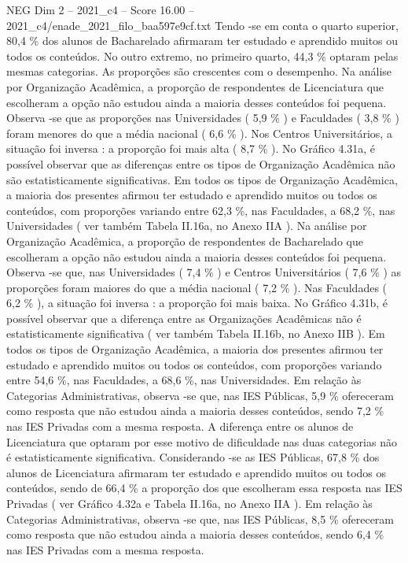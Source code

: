 \begin{textsample}{NEG Dim 2 – 2021\_c4 – Score 16.00 – 2021\_c4/enade\_2021\_filo\_baa597e9cf.txt}
Tendo -se em conta o quarto superior, 80,4 \% dos alunos de Bacharelado afirmaram ter estudado e aprendido muitos ou todos os conteúdos.
No outro extremo, no primeiro quarto, 44,3 \% optaram pelas mesmas categorias.
As proporções são crescentes com o desempenho.
Na análise por Organização Acadêmica, a proporção de respondentes de Licenciatura que escolheram a opção não estudou ainda a maioria desses conteúdos foi pequena.
Observa -se que as proporções nas Universidades ( 5,9 \% ) e Faculdades ( 3,8 \% ) foram menores do que a média nacional ( 6,6 \% ).
Nos Centros Universitários, a situação foi inversa : a proporção foi mais alta ( 8,7 \% ).
No Gráfico 4.31a, é possível observar que as diferenças entre os tipos de Organização Acadêmica não são estatisticamente significativas.
Em todos os tipos de Organização Acadêmica, a maioria dos presentes afirmou ter estudado e aprendido muitos ou todos os conteúdos, com proporções variando entre 62,3 \%, nas Faculdades, a 68,2 \%, nas Universidades ( ver também Tabela II.16a, no Anexo IIA ).
Na análise por Organização Acadêmica, a proporção de respondentes de Bacharelado que escolheram a opção não estudou ainda a maioria desses conteúdos foi pequena.
Observa -se que, nas Universidades ( 7,4 \% ) e Centros Universitários ( 7,6 \% ) as proporções foram maiores do que a média nacional ( 7,2 \% ).
Nas Faculdades ( 6,2 \% ), a situação foi inversa : a proporção foi mais baixa.
No Gráfico 4.31b, é possível observar que a diferença entre as Organizações Acadêmicas não é estatisticamente significativa ( ver também Tabela II.16b, no Anexo IIB ).
Em todos os tipos de Organização Acadêmica, a maioria dos presentes afirmou ter estudado e aprendido muitos ou todos os conteúdos, com proporções variando entre 54,6 \%, nas Faculdades, a 68,6 \%, nas Universidades.
Em relação às Categorias Administrativas, observa -se que, nas IES Públicas, 5,9 \% ofereceram como resposta que não estudou ainda a maioria desses conteúdos, sendo 7,2 \% nas IES Privadas com a mesma resposta.
A diferença entre os alunos de Licenciatura que optaram por esse motivo de dificuldade nas duas categorias não é estatisticamente significativa.
Considerando -se as IES Públicas, 67,8 \% dos alunos de Licenciatura afirmaram ter estudado e aprendido muitos ou todos os conteúdos, sendo de 66,4 \% a proporção dos que escolheram essa resposta nas IES Privadas ( ver Gráfico 4.32a e Tabela II.16a, no Anexo IIA ).
Em relação às Categorias Administrativas, observa -se que, nas IES Públicas, 8,5 \% ofereceram como resposta que não estudou ainda a maioria desses conteúdos, sendo 6,4 \% nas IES Privadas com a mesma resposta.

\end{textsample}

